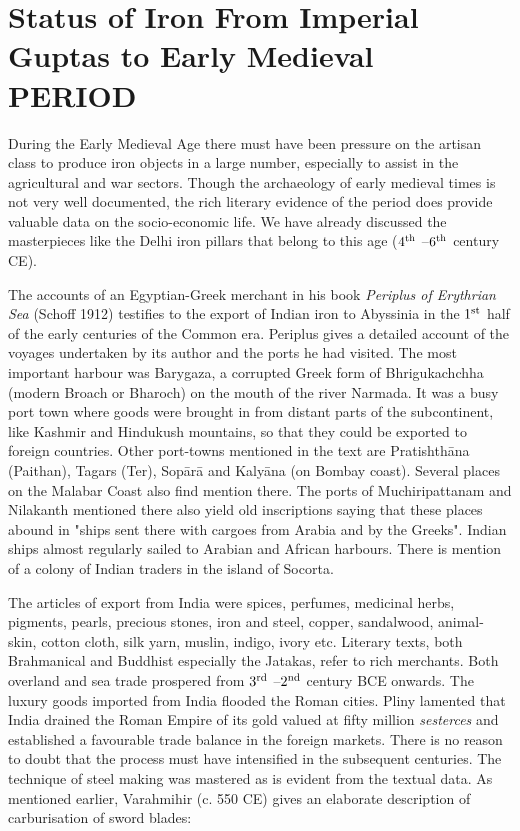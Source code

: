 \section*{Status of Iron From Imperial Guptas to Early Medieval PERIOD}\label{section-1}

During the Early Medieval Age there must have been pressure on the artisan class to produce iron objects in a large number, especially to assist in the agricultural and war sectors. Though the archaeology of early medieval times is not very well documented, the rich literary evidence of the period does provide valuable data on the socio-economic life. We have already discussed the masterpieces like the Delhi iron pillars that belong to this age ($4^{\rm th}$ –$6^{\rm th}$  century CE).

The accounts of an Egyptian-Greek merchant in his book {\it Periplus of Erythrian Sea} (Schoff 1912) testifies to the export of Indian iron to Abyssinia in the $1^{\rm st}$ half of the early centuries of the Common era. Periplus gives a detailed account of the voyages undertaken by its author and the ports he had visited. The most important harbour was Barygaza, a corrupted Greek form of Bhrigukachchha (modern Broach or Bharoch) on the mouth of the river Narmada. It was a busy port town where goods were brought in from distant parts of the subcontinent, like Kashmir and Hindukush mountains, so that they could be exported to foreign countries. Other port-towns mentioned in the text are Pratishthāna (Paithan), Tagars (Ter), Sopārā and Kalyāna (on Bombay coast). Several places on the Malabar Coast also find mention there. The ports of Muchiripattanam and Nilakanth mentioned there also yield old inscriptions saying that these places abound in "ships sent there with cargoes from Arabia and by the Greeks". Indian ships almost regularly sailed to Arabian and African harbours. There is mention of a colony of Indian traders in the island of Socorta.

The articles of export from India were spices, perfumes, medicinal herbs, pigments, pearls, precious stones, iron and steel, copper, sandalwood, animal-skin, cotton cloth, silk yarn, muslin, indigo, ivory etc. Literary texts, both Brahmanical and Buddhist especially the Jatakas, refer to rich merchants. Both overland and sea trade prospered from $3^{\rm rd}$ –$2^{\rm nd}$ century BCE onwards. The luxury goods imported from India flooded the Roman cities. Pliny lamented that India drained the Roman Empire of its gold valued at fifty million {\it sesterces} and established a favourable trade balance in the foreign markets. There is no reason to doubt that the process must have intensified in the subsequent centuries. The technique of steel making was mastered as is evident from the textual data. As mentioned earlier, Varahmihir (c. 550 CE) gives an elaborate description of carburisation of sword blades: 

